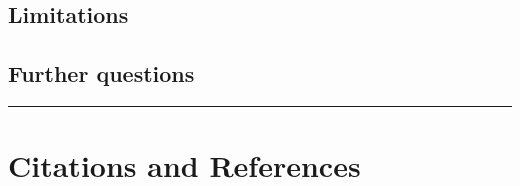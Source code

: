 \documentclass[
]{article}
\begin{document}
\hypertarget{limitations}{%
\subsection{Limitations}\label{limitations}}

\hypertarget{further-questions}{%
\subsection{Further questions}\label{further-questions}}

\begin{center}\rule{0.5\linewidth}{0.5pt}\end{center}

\hypertarget{citations-and-references}{%
\section{Citations and References}\label{citations-and-references}}
\end{document}
